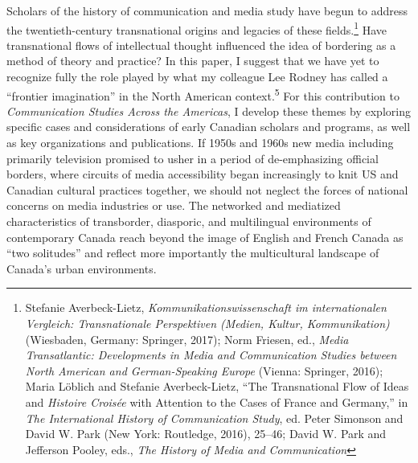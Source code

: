 \documentclass{tufte-handout}
\begin{document}
Scholars of the history of communication and media study have begun to
address the twentieth-century transnational origins and legacies of
these fields.\footnote{Stefanie Averbeck-Lietz,
  \emph{Kommunikationswissenschaft im internationalen Vergleich:
  Transnationale Perspektiven (Medien, Kultur, Kommunikation)}
  (Wiesbaden, Germany: Springer, 2017); Norm Friesen, ed., \emph{Media
  Transatlantic: Developments in Media and Communication Studies between
  North American and German-Speaking Europe} (Vienna: Springer, 2016);
  Maria Löblich and Stefanie Averbeck-Lietz, ``The Transnational Flow of
  Ideas and \emph{Histoire Croisée} with Attention to the Cases of
  France and Germany,'' in \emph{The International History of
  Communication Study}, ed. Peter Simonson and David W. Park (New York:
  Routledge, 2016), 25--46; David W. Park and Jefferson Pooley, eds.,
  \emph{The History of Media and Communication}} Have transnational flows of intellectual thought influenced
the idea of bordering as a method of theory and practice? In this paper,
I suggest that we have yet to recognize fully the role played by what my
colleague Lee Rodney has called a ``frontier imagination'' in the North
American context.\textsuperscript{5}
For this contribution to \emph{Communication Studies Across the
Americas}, I develop these themes by exploring specific cases and
considerations of early Canadian scholars and programs, as well as key
organizations and publications. If 1950s and 1960s new media including
primarily television promised to usher in a period of de-emphasizing
official borders, where circuits of media accessibility began
increasingly to knit US and Canadian cultural practices together, we
should not neglect the forces of national concerns on media industries
or use. The networked and mediatized characteristics of transborder,
diasporic, and multilingual environments of contemporary Canada reach
beyond the image of English and French Canada as ``two solitudes'' and
reflect more importantly the multicultural landscape of Canada's urban
environments.
\end{document}
